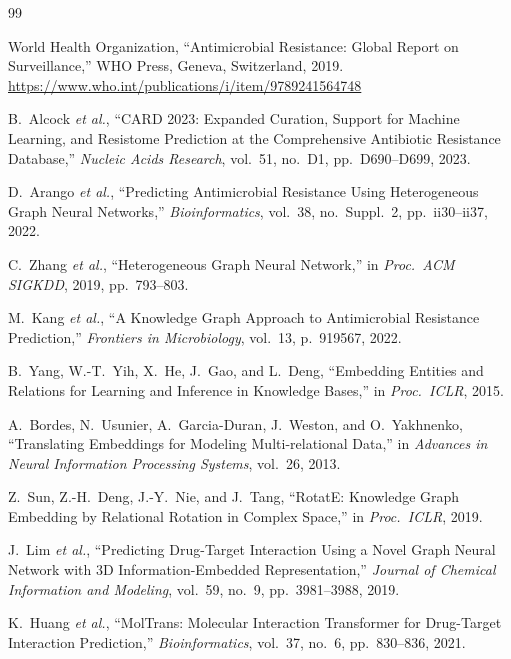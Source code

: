 \documentclass[conference]{IEEEtran}
\begin{document}


\begin{thebibliography}{99}

World Health Organization, ``Antimicrobial Resistance: Global Report on
Surveillance,'' WHO Press, Geneva, Switzerland, 2019.
\url{https://www.who.int/publications/i/item/9789241564748}

B.~Alcock \textit{et al.}, ``CARD 2023: Expanded Curation, Support for
Machine Learning, and Resistome Prediction at the Comprehensive Antibiotic
Resistance Database,'' \textit{Nucleic Acids Research}, vol.~51, no.~D1,
pp.~D690--D699, 2023.

D.~Arango \textit{et al.}, ``Predicting Antimicrobial Resistance Using
Heterogeneous Graph Neural Networks,'' \textit{Bioinformatics}, vol.~38,
no.~Suppl.~2, pp.~ii30--ii37, 2022.

C.~Zhang \textit{et al.}, ``Heterogeneous Graph Neural Network,''
in \textit{Proc.\ ACM SIGKDD}, 2019, pp.~793--803.

M.~Kang \textit{et al.}, ``A Knowledge Graph Approach to Antimicrobial
Resistance Prediction,'' \textit{Frontiers in Microbiology}, vol.~13,
p.~919567, 2022.

B.~Yang, W.-T.~Yih, X.~He, J.~Gao, and L.~Deng, ``Embedding Entities and
Relations for Learning and Inference in Knowledge Bases,'' in
\textit{Proc.\ ICLR}, 2015.

A.~Bordes, N.~Usunier, A.~Garcia-Duran, J.~Weston, and O.~Yakhnenko,
``Translating Embeddings for Modeling Multi-relational Data,'' in
\textit{Advances in Neural Information Processing Systems}, vol.~26, 2013.

Z.~Sun, Z.-H.~Deng, J.-Y.~Nie, and J.~Tang, ``RotatE: Knowledge Graph
Embedding by Relational Rotation in Complex Space,'' in
\textit{Proc.\ ICLR}, 2019.

J.~Lim \textit{et al.}, ``Predicting Drug-Target Interaction Using a
Novel Graph Neural Network with 3D Information-Embedded Representation,''
\textit{Journal of Chemical Information and Modeling}, vol.~59, no.~9,
pp.~3981--3988, 2019.

K.~Huang \textit{et al.}, ``MolTrans: Molecular Interaction Transformer for
Drug-Target Interaction Prediction,'' \textit{Bioinformatics}, vol.~37,
no.~6, pp.~830--836, 2021.


\end{thebibliography}
\end{document}

